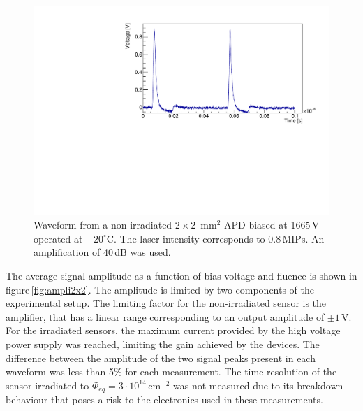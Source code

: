 \documentclass[3p,preprint,twocolumn]{elsarticle}
\begin{document}
\begin{figure}
  \centering
  \includegraphics[width = \columnwidth]{APD_394-1-51_1665V_evt1100_2pulses}
  \caption{Waveform from a non-irradiated $2 \times 2$~mm$^2$ APD biased at 1665\,V operated at $-20^\circ$C. The laser intensity corresponds to 0.8\,MIPs. An amplification of 40\,dB was used.}
  \label{fig:pulses2x2timing}
\end{figure}

The average signal amplitude as a function of bias voltage and fluence is shown in figure\,\ref{fig:ampli2x2}.
The amplitude is limited by two components of the experimental setup.
The limiting factor for the non-irradiated sensor is the amplifier, that has a linear range corresponding to an output amplitude of $\pm 1$\,V.
For the irradiated sensors, the maximum current provided by the high voltage power supply was reached, limiting the gain achieved by the devices.
The difference between the amplitude of the two signal peaks present in each waveform was less than 5\% for each measurement.
The time resolution of the sensor irradiated to $\Phi_{eq} = 3 \cdot 10^{14}$\,cm$^{-2}$ was not measured due to its breakdown behaviour that poses a risk to the electronics used in these measurements.
\end{document}
